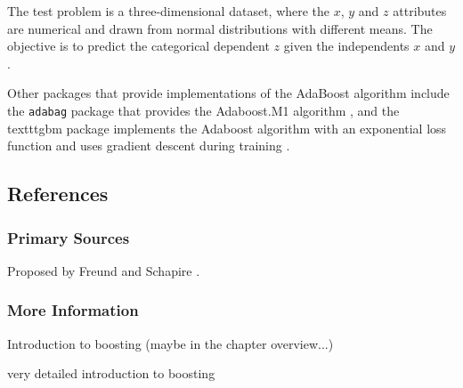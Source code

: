 The test problem is a three-dimensional dataset, where the $x$, $y$ and $z$ attributes are numerical and drawn from normal distributions with different means. The objective is to predict the categorical dependent $z$ given the independents $x$ and $y$.



Other packages that provide implementations of the AdaBoost algorithm include the \texttt{adabag} package that provides the Adaboost.M1 algorithm \cite{Cortes2011}, and the texttt{gbm} package implements the Adaboost algorithm with an exponential loss function and uses gradient descent during training \cite{Ridgeway2007a}.

\subsection{References}

\subsubsection{Primary Sources}

Proposed by Freund and Schapire \cite{Freund1997}.

\subsubsection{More Information}


Introduction to boosting \cite{Freund1999} (maybe in the chapter overview...)

very detailed introduction to boosting \cite{Meir2003}

